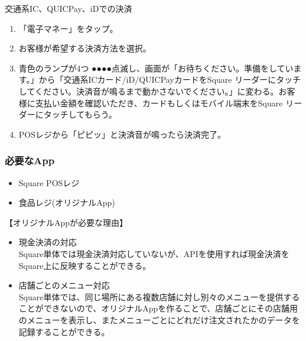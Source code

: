 \documentclass[dvipdfmx,jb5]{jarticle}
\begin{document}
\begin{itemize}
  交通系IC、QUICPay、iDでの決済
  \begin{enumerate}[手順1]
   \item 「電子マネー」をタップ。
   \item お客様が希望する決済方法を選択。
   \item 青色のランプが4つ{\color{blue} ●●●●}点滅し、画面が「お待ちください。準備をしています。」から「交通系ICカード/iD/QUICPayカードをSquare リーダーにタッチしてください。決済音が鳴るまで動かさないでください。」に変わる。お客様に支払い金額を確認いただき、カードもしくはモバイル端末をSquare リーダーにタッチしてもらう。
   \item POSレジから「ピピッ」と決済音が鳴ったら決済完了。
  \end{enumerate}
 \end{itemize}
 \subsubsection{必要なApp}
 \begin{itemize}
 \item Square POSレジ
 \item 食品レジ(オリジナルApp)
 \end{itemize}
 \begin{itembox}[l]{【オリジナルAppが必要な理由】}
  \begin{itemize}
   \item 現金決済の対応\\
   Square単体では現金決済対応していないが、APIを使用すれば現金決済をSquare上に反映することができる。
   \item 店舗ごとのメニュー対応\\
   Square単体では、同じ場所にある複数店舗に対し別々のメニューを提供することができないので、オリジナルAppを作ることで、店舗ごとにその店舗用のメニューを表示し、またメニューごとにどれだけ注文されたかのデータを記録することができる。
  \end{itemize}
 \end{itembox}
\end{document}
